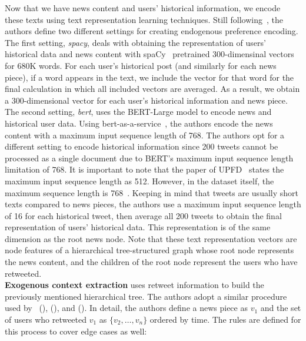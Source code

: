 Now that we have news content and users' historical information, we encode these texts using text representation learning techniques. Still following~\cite{UPFD_Dataset_Shu}, the authors define two different settings for creating endogenous preference encoding. The first setting, \emph{spacy}, deals with obtaining the representation of users' historical data and news content with spaCy~\parencite{SpaCy_Honnibal} pretrained 300-dimensinal vectors for 680K words. For each user's historical post (and similarly for each news piece), if a word appears in the text, we include the vector for that word for the final calculation in which all included vectors are averaged. As a result, we obtain a 300-dimensional vector for each user's historical information and news piece. The second setting, \emph{bert}, uses the BERT-Large model to encode news and historical user data. Using bert-as-a-service~\parencite{BertAsAService_Xiao}, the authors encode the news content with a maximum input sequence length of 768. The authors opt for a different setting to encode historical information since 200 tweets cannot be processed as a single document due to BERT's maximum input sequence length limitation of 768. It is important to note that the paper of UPFD~\parencite{UPFD_Dataset_Shu} states the maximum input sequence length as 512. However, in the dataset itself, the maximum sequence length is 768~\parencite{UPFD_PyGTeam}. Keeping in mind that tweets are usually short texts compared to news pieces, the authors use a maximum input sequence length of 16 for each historical tweet, then average all 200 tweets to obtain the final representation of users' historical data. This representation is of the same dimension as the root news node. Note that these text representation vectors are node features of a hierarchical tree-structured graph whose root node represents the news content, and the children of the root node represent the users who have retweeted.\\
\textbf{Exogenous context extraction} uses retweet information to build the previously mentioned hierarchical tree. The authors adopt a similar procedure used by~\citeauthor{GraphNeuralNetworksWithContinualLearningFakeNewsDetection_Han} (\citeyear{GraphNeuralNetworksWithContinualLearningFakeNewsDetection_Han}),\citeauthor{GeometricDeepLearningOnGraphsAndManifolds_Monti} (\citeyear{GeometricDeepLearningOnGraphsAndManifolds_Monti}), and \citeauthor{HierarchicalPropagationNetworksForFND_Shu} (\citeyear{HierarchicalPropagationNetworksForFND_Shu}). In detail, the authors define a news piece as $v_1$ and the set of users who retweeted $v_1$ as $\{v_2, \dots , v_n\}$ ordered by time. The rules are defined for this process to cover edge cases as well:
